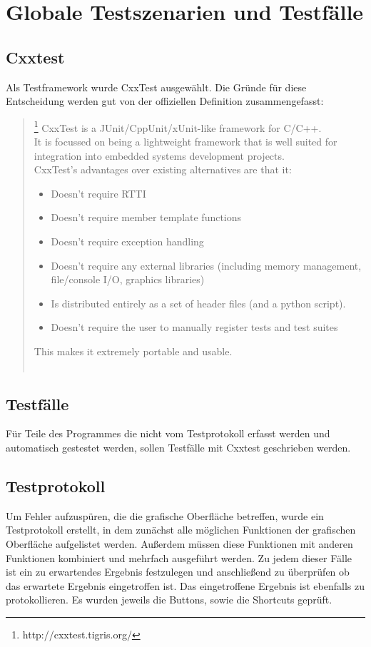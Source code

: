 \section{Globale Testszenarien und Testfälle}
\subsection{Cxxtest}
Als Testframework wurde CxxTest ausgewählt. Die Gründe für diese Entscheidung werden gut von der offiziellen Definition zusammengefasst: 
\begin{quote}\footnote{http://cxxtest.tigris.org/}
    CxxTest is a JUnit/CppUnit/xUnit-like framework for C/C++.\ \\
    It is focussed on being a lightweight framework that is well suited for 
    integration into embedded systems development projects.\ \\
    CxxTest's advantages over existing alternatives are that it:
    \begin{itemize}
        \item Doesn't require RTTI
        \item Doesn't require member template functions
        \item Doesn't require exception handling
        \item Doesn't require any external libraries (including memory management, file/console I/O, graphics libraries)
        \item Is distributed entirely as a set of header files (and a python script).
        \item Doesn't require the user to manually register tests and test suites 
    \end{itemize}
    This makes it extremely portable and usable.\ \\ \\
\end{quote} 
\subsection{Testfälle}
Für Teile des Programmes die nicht vom Testprotokoll erfasst werden und automatisch gestestet werden, sollen Testfälle mit Cxxtest
geschrieben werden.   
\subsection{Testprotokoll}
Um Fehler aufzuspüren, die die grafische Oberfläche betreffen, wurde ein Testprotokoll erstellt, in dem zunächst
alle möglichen Funktionen der grafischen Oberfläche aufgelistet werden. Außerdem müssen diese Funktionen mit 
anderen Funktionen kombiniert und mehrfach ausgeführt werden. Zu jedem dieser Fälle ist ein zu erwartendes Ergebnis
festzulegen und anschließend zu überprüfen ob das erwartete Ergebnis eingetroffen ist. Das eingetroffene Ergebnis
ist ebenfalls zu protokollieren. Es wurden jeweils die Buttons, sowie die Shortcuts geprüft.


